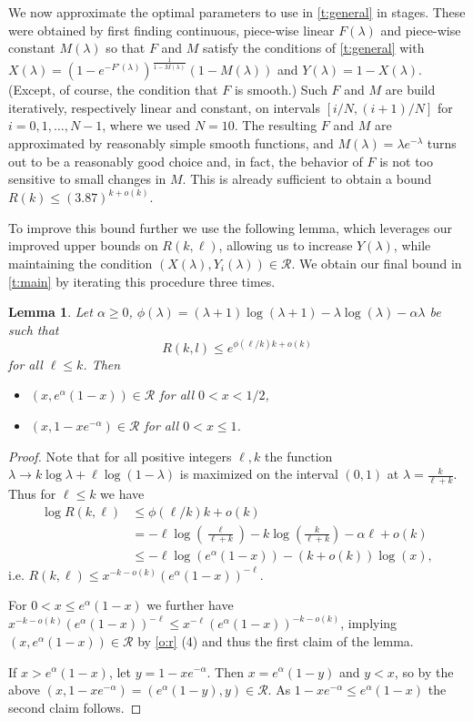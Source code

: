 \documentclass[reqno,final,12pt]{amsart}
\newtheorem{lem}[thm]{Lemma}
\newcommand{\mc}[1]{\mathcal{#1}}
\newcommand{\fs}[2]{\left(\frac{#1}{#2}\right)}
\begin{document}
We now approximate the optimal parameters to use in \cref{t:general} in stages. These were obtained by first finding continuous, piece-wise linear $F(\lambda)$ and piece-wise constant $M(\lambda)$ so that $F$ and $M$ satisfy the conditions of \cref{t:general} with $X(\lambda)= (1 - e^{-F'(\lambda)})^{\frac{1}{1-M(\lambda)}}(1-M(\lambda))$ and $Y(\lambda)=1-X(\lambda)$. (Except, of course, the condition that $F$ is smooth.)
Such $F$ and $M$  are build iteratively, respectively linear and constant, on intervals $[i/N,(i+1)/N]$ for $i=0,1,\ldots, N-1$, where we used $N=10$. The resulting $F$ and $M$ are approximated by reasonably simple smooth functions, and $M(\lambda)= \lambda  e^{-\lambda}$ turns out to be a reasonably good choice and, in fact, the behavior of $F$ is not too sensitive to small changes in $M$. This is already sufficient to obtain a bound $R(k) \leq (3.87)^{k+o(k)}$.

To improve this bound further we use the following lemma, which leverages our improved upper bounds on $R(k, \ell)$, allowing us to increase $Y(\lambda)$, while maintaining the condition $(X(\lambda),Y_i(\lambda)) \in \mc{R}$.  We obtain our final bound in \cref{t:main} by iterating this procedure  three times.


\begin{lem}\label{l:y} Let $\alpha \geq 0$, $\phi(\lambda)= (\lambda+1) \log (\lambda+1)-\lambda \log (\lambda) -\alpha\lambda$  be such that
	$$ R(k,l) \leq e^{\phi(\ell/k)k+o(k)}$$
	for all $\ell \leq k$. Then \begin{itemize}
		\item $(x,e^{\alpha}(1-x)) \in \mc{R}$ for all $0< x <1/2$,
		\item $(x,1-xe^{-\alpha}) \in \mc{R}$ for all $0<x \leq 1$.
	\end{itemize} 
\end{lem}
	
\begin{proof}
Note that for all positive integers $\ell,k$ the function $ \lambda \to k\log \lambda + \ell \log(1-\lambda)$ is maximized on the interval $(0,1)$ at $\lambda=\frac{k}{\ell+k}$.
Thus for $\ell \leq k$ we have \begin{align*} \log R(k,\ell) &\leq \phi(\ell/k)k+o(k) \\&= -{\ell}\log \fs{\ell}{\ell +k} - k \log \fs{k}{\ell +k} -\alpha \ell+o(k) \\&\leq 
-{\ell}\log(e^{\alpha}(1-x)) - (k+o(k)) \log(x), 
\end{align*} 
i.e. $R(k,\ell) \leq x^{-k-o(k)}(e^{\alpha}(1-x))^{-\ell}.$

For $0< x \leq e^{\alpha}(1-x)$ we further have $x^{-k-o(k)}(e^{\alpha}(1-x))^{-\ell} \leq x^{-\ell}(e^{\alpha}(1-x))^{-k-o(k)}$, implying $(x,e^{\alpha}(1-x)) \in \mc{R}$ by \cref{o:r} (4) and thus the first claim of the lemma. 

If $x > e^{\alpha}(1-x)$, let $y=1 -  xe^{-\alpha}$. Then $x=e^{\alpha}(1-y)$ and $y < x$, so by the above $(x,1-xe^{-\alpha})=(e^{\alpha}(1-y),y) \in \mc{R}$. As
$1-xe^{-\alpha} \leq e^{\alpha}(1-x)$ the second claim follows.
\end{proof}
\end{document}
